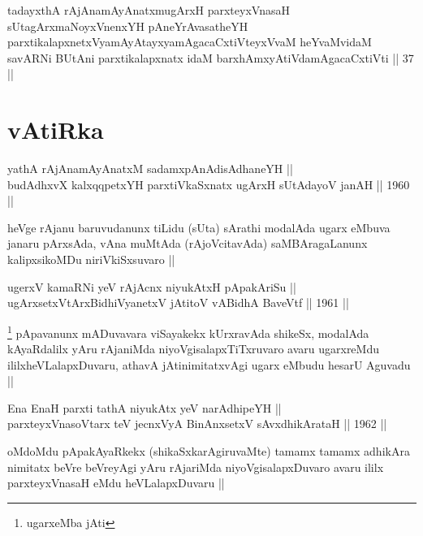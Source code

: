 \begin{shl}
tadayxthA rAjAnamAyAnatxmugArxH parxteyxVnasaH sUtagArxmaNoyxV\s nenxYH pAneYrAvasatheYH parxtikalapxnetxV\s yamAyAtayxyamAgacaCxtiVteyxVvaM heYvaMvidaM savARNi BUtAni parxtikalapxnatx idaM barxhAmxyAtiVdamAgacaCxtiVti || 37 ||
\end{shl}

\section*{vAtiRka}

\begin{shl}
yathA rAjAnamAyAnatxM sadamxpAnAdisAdhaneYH || \\
budAdhxvX kalxqqpetxYH parxtiVkaSxnatx ugArxH sUtAdayoV janAH ||  1960 ||  
\end{shl}

\begin{artha}
heVge rAjanu baruvudanunx tiLidu (sUta) sArathi modalAda ugarx eMbuva
janaru pArxsAda, vAna muMtAda (rAjoVcitavAda) saMBAragaLanunx
kalipxsikoMDu niriVkiSxsuvaro ||
\end{artha}


\begin{shl}
ugerxV kamaRNi yeV rAjAcnx niyukAtxH pApakAriSu || \\
ugArxsetxV\s tArxBidhiVyanetxV jAtitoV vA\s BidhA BaveVtf ||  1961 ||  
\end{shl}

\begin{artha}
\footnote[1]{ugarxeMba jAti}
pApavanunx mADuvavara viSayakekx kUrxravAda shikeSx, modalAda
kAyaRdalilx yAru rAjaniMda niyoVgisalapxTiTxruvaro avaru ugarxreMdu
ililxheVLalapxDuvaru, athavA jAtinimitatxvAgi ugarx eMbudu hesarU
Aguvadu ||
\end{artha}


\begin{shl}
Ena EnaH parxti tathA niyukAtx yeV narAdhipeYH || \\
parxteyxVnasoV\s tarx teV jecnxVyA BinAnxsetxV sAvxdhikArataH ||  1962 ||  
\end{shl}

\begin{artha}
oMdoMdu pApakAyaRkekx (shikaSxkarAgiruvaMte) tamamx tamamx adhikAra
nimitatx beVre beVreyAgi yAru rAjariMda niyoVgisalapxDuvaro avaru
ililx parxteyxVnasaH eMdu heVLalapxDuvaru ||
\end{artha}

